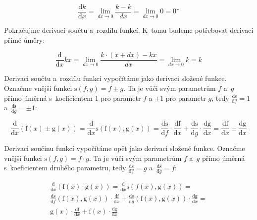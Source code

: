 \begin{equation}
\frac{\mathrm{d}k}{\mathrm{d}x} = \lim_{dx \to 0} \frac{k - k}{dx} = \lim_{dx \to 0} 0 = 0¨
\end{equation}

Pokračujme derivací součtu a~rozdílu funkcí. K~tomu budeme potřebovat derivaci přímé úměry:

\begin{equation}
\frac{\mathrm{d}}{\mathrm{d}x} kx = \lim_{dx \to 0} \frac{k \cdot (x + dx) - kx}{dx} = \lim_{dx \to 0} k = k
\end{equation}

Derivaci součtu a~rozdílu funkcí vypočítáme jako derivaci složené funkce. Označme vnější funkci \(\mathrm{s}(f, g) = f \pm g\). Ta je vůči svým parametrům \(f\) a~\(g\) přímo úměrná s~koeficientem 1 pro parametr \(f\) a \(\pm1\) pro parametr \(g\), tedy \(\frac{\mathrm{ds}}{\mathrm{d}f} = 1\) a~\(\frac{\mathrm{ds}}{\mathrm{d}g} = \pm1\):

\begin{equation}
\frac{\mathrm{d}}{\mathrm{d}x} (\mathrm{f}(x) \pm \mathrm{g}(x)) = \frac{\mathrm{d}}{\mathrm{d}x} \mathrm{s}(\mathrm{f}(x), \mathrm{g}(x)) = \frac{\mathrm{ds}}{\mathrm{d}f} \cdot \frac{\mathrm{df}}{\mathrm{d}x} + \frac{\mathrm{ds}}{\mathrm{d}g} \cdot \frac{\mathrm{dg}}{\mathrm{d}x} = \frac{\mathrm{df}}{\mathrm{d}x} \pm \frac{\mathrm{dg}}{\mathrm{d}x}
\end{equation}

Derivaci součinu funkcí vypočítáme opět jako derivaci složené funkce. Označme vnější funkci \(\mathrm{s}(f, g) = f \cdot g\). Ta je vůči svým parametrům \(f\) a~\(g\) přímo úměrná s~koeficientem druhého parametru, tedy \(\frac{\mathrm{ds}}{\mathrm{d}f} = g\) a~\(\frac{\mathrm{ds}}{\mathrm{d}g} = f\):

\begin{equation}
\begin{split}
\frac{\mathrm{d}}{\mathrm{d}x} (\mathrm{f}(x) \cdot \mathrm{g}(x)) = \frac{\mathrm{d}}{\mathrm{d}x} \mathrm{s}({f}(x), \mathrm{g}(x)) = \\
\frac{\mathrm{ds}}{\mathrm{d}f} (\mathrm{f}(x), \mathrm{g}(x)) \cdot \frac{\mathrm{df}}{\mathrm{d}x} + \frac{\mathrm{ds}}{\mathrm{d}g}(\mathrm{f}(x), \mathrm{g}(x)) \cdot \frac{\mathrm{dg}}{\mathrm{d}x} = \\
\mathrm{g}(x) \cdot \frac{\mathrm{df}}{\mathrm{d}x} + \mathrm{f}(x) \cdot \frac{\mathrm{dg}}{\mathrm{d}x}
\end{split}
\end{equation}

